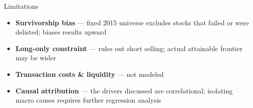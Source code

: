 \documentclass[aspectratio=169]{beamer}
\begin{document}
\begin{frame}{Limitations}
  \begin{itemize}
    \item \textbf{Survivorship bias} --- fixed 2015 universe excludes stocks that failed or were delisted; biases results upward
    \item \textbf{Long-only constraint} --- rules out short selling; actual attainable frontier may be wider
    \item \textbf{Transaction costs \& liquidity} --- not modeled
    \item \textbf{Causal attribution} --- the drivers discussed are correlational; isolating macro causes requires further regression analysis
  \end{itemize}
\end{frame}

\end{document}
